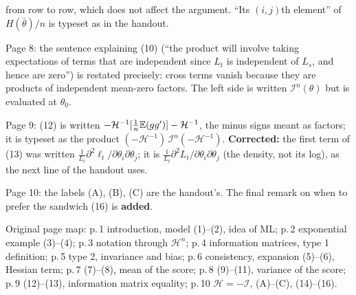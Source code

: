 \documentclass[11pt]{article}
\begin{document}
\begin{transcriptnotes}
       from row to row, which does not affect the argument. ``Its $(i,j)$th element'' of
       $H(\bar\theta)/n$ is typeset as in the handout.
 \item Page 8: the sentence explaining (10) (``the product will involve taking expectations of
       terms that are independent since $L_{t}$ is independent of $L_{s}$, and hence are zero'') is
       restated precisely: cross terms vanish because they are products of independent
       mean-zero factors. The left side is written $\mathcal I^{n}(\theta)$ but is evaluated at
       $\theta_{0}$.
 \item Page 9: (12) is written $-\mathcal H^{-1}[\frac1n\mathbb{E}(gg')]-\mathcal H^{-1}$, the minus signs
       meant as factors; it is typeset as the product
       $(-\mathcal H^{-1})\,\mathcal I^{n}(-\mathcal H^{-1})$.
       \textbf{Corrected:} the first term of (13) was written $\frac{1}{L_{t}}\partial^{2}\ell_{t}/\partial\theta_{i}\partial\theta_{j}$;
       it is $\frac{1}{L_{t}}\partial^{2}L_{t}/\partial\theta_{i}\partial\theta_{j}$ (the density, not its log), as the
       next line of the handout uses.
 \item Page 10: the labels (A), (B), (C) are the handout's. The final remark on when to
       prefer the sandwich (16) is \textbf{added}.
 \item Original page map: p.\,1 introduction, model (1)--(2), idea of ML; p.\,2 exponential
       example (3)--(4); p.\,3 notation through $\mathcal H^{n}$; p.\,4 information matrices, type 1
       definition; p.\,5 type 2, invariance and bias; p.\,6 consistency, expansion (5)--(6),
       Hessian term; p.\,7 (7)--(8), mean of the score; p.\,8 (9)--(11), variance of the score;
       p.\,9 (12)--(13), information matrix equality; p.\,10 $\mathcal H=-\mathcal I$, (A)--(C), (14)--(16).
\end{transcriptnotes}
\end{document}
